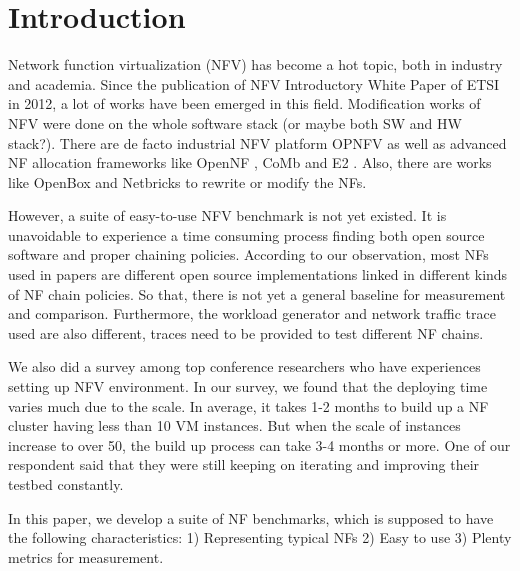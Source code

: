 \section{Introduction}

Network function virtualization (NFV) has become a hot topic, both in industry and academia.
Since the publication of NFV Introductory White Paper \cite{} of ETSI in 2012, a lot of works have been emerged in this field. 
Modification works of NFV were done on the whole software stack (or maybe both SW and HW stack?). 
There are de facto industrial NFV platform OPNFV \cite{noauthor_home_nodate} as well as advanced NF allocation frameworks like OpenNF \cite{gember-jacobson_opennf:_2014}, CoMb \cite{180672} and E2 \cite{palkar_e2:_2015}. 
Also, there are works like OpenBox \cite{bremler-barr_openbox:_2016} and Netbricks \cite{199352} to rewrite or modify the NFs.


However, a suite of easy-to-use NFV benchmark is not yet existed. It is unavoidable to experience a time consuming process finding both open source software and proper chaining policies. According to our observation, most NFs used in papers are different open source implementations linked in different kinds of NF chain policies. So that, there is not yet a general baseline for measurement and comparison. Furthermore, the workload generator and network traffic trace used are also different, traces need to be provided to test different NF chains.

We also did a survey among top conference researchers who have experiences setting up NFV environment. In our survey, we found that the deploying time varies much due to the scale. In average, it takes 1-2 months to build up a NF cluster having less than 10 VM instances. But when the scale of instances increase to over 50, the build up process can take 3-4 months or more. One of our respondent said that they were still keeping on iterating and improving their testbed constantly.



In this paper, we develop a suite of NF benchmarks, which is supposed to have the following characteristics: 1) Representing typical NFs 2) Easy to use 3) Plenty metrics for measurement.

